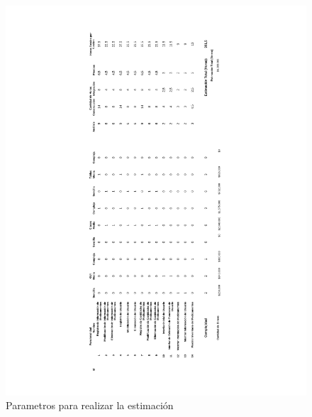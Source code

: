 \begin{figure}[htb]
	\centering
	\includegraphics[width=1.2\linewidth]{capitulo4/img/PROBE.png}
	\caption{Parametros para realizar la estimaci\'on}
\end{figure}

